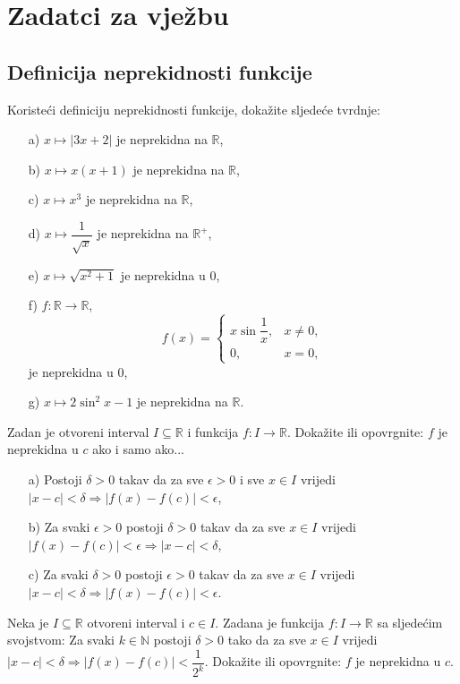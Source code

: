 \newpage
\section*{Zadatci za vježbu}
\subsection*{Definicija neprekidnosti funkcije}
\begin{exercise}
Koristeći definiciju neprekidnosti funkcije, dokažite sljedeće tvrdnje: 
\begin{itemize}
\item[a)] $x\mapsto |3x+2|$ je neprekidna na $\mathbb{R}$,
\item[b)] $x\mapsto x(x+1)$ je neprekidna na $\mathbb{R}$,
\item[c)] $x\mapsto x^3$ je neprekidna na $\mathbb{R}$,
\item[d)] $x\mapsto \dfrac{1}{\sqrt{x}}$ je neprekidna na $\mathbb{R}^+$,
\item[e)] $x\mapsto \sqrt{x^2+1}$ je neprekidna u $0$,
\item[f)] $f : \mathbb{R}\to \mathbb{R}$, $$f(x)=\begin{cases}
x\sin{\dfrac{1}{x}}, & x\neq 0,\\
0, & x=0,
\end{cases}
$$ 
je neprekidna u $0$,
\item[g)] $x\mapsto 2\sin^2{x}-1$ je neprekidna na $\mathbb{R}$.
\end{itemize}
\end{exercise}
\begin{exercise}
Zadan je otvoreni interval $I\subseteq \mathbb{R}$ i funkcija $f : I\to \mathbb{R}$. Dokažite ili opovrgnite: $f$ je neprekidna u $c$ ako i samo ako...
\begin{itemize}
\item[a)] Postoji $\delta>0$ takav da za sve $\epsilon>0$ i sve $x\in I$ vrijedi $|x-c|<\delta\Rightarrow |f(x)-f(c)|<\epsilon$,
\item[b)] Za svaki $\epsilon>0$ postoji $\delta>0$ takav da za sve $x\in I$ vrijedi $|f(x)-f(c)|<\epsilon\Rightarrow |x-c|<\delta$,
\item[c)] Za svaki $\delta>0$ postoji $\epsilon>0$ takav da za sve $x\in I$ vrijedi $|x-c|<\delta\Rightarrow |f(x)-f(c)|<\epsilon$.
\end{itemize}
\end{exercise}
\begin{exercise}
Neka je $I\subseteq \mathbb{R}$ otvoreni interval i $c\in I$. Zadana je funkcija $f : I\to \mathbb{R}$ sa sljedećim svojstvom: Za svaki $k\in \mathbb{N}$ postoji $\delta>0$ tako da za sve $x\in I$ vrijedi $|x-c|<\delta\Rightarrow |f(x)-f(c)|<\dfrac{1}{2^k}$. Dokažite ili opovrgnite: $f$ je neprekidna u $c$.
\end{exercise}

